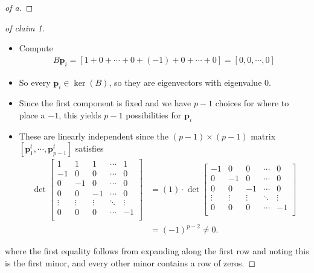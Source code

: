 \begin{solution}
\begin{proof}[of a]
\end{proof}

\begin{proof}[of claim 1]

\envlist

\begin{itemize}
\tightlist
\item
  Compute
  \begin{align*}B \mathbf{p}_i = {\left[ { 1 + 0 + \cdots + 0 + (-1) + 0 + \cdots + 0} \right]} = {\left[ {0, 0, \cdots, 0} \right]}\end{align*}
\item
  So every \(\mathbf{p}_i \in \ker(B)\), so they are eigenvectors with
  eigenvalue 0.
\item
  Since the first component is fixed and we have \(p-1\) choices for
  where to place a \(-1\), this yields \(p-1\) possibilities for
  \(\mathbf{p}_i\)
\item
  These are linearly independent since the \((p-1)\times (p-1)\) matrix
  \({\left[ { \mathbf{p}_1^t, \cdots, \mathbf{p}_{p-1}^t} \right]}\)
  satisfies
  \begin{align*}
  \det 
  \begin{bmatrix}
  1 & 1 & 1 & \cdots & 1\\
  -1 & 0  & 0 & \cdots & 0\\
  0 & -1  & 0 & \cdots & 0\\
  0 & 0 & -1 & \cdots & 0\\
  \vdots & \vdots  & \vdots & \ddots & \vdots \\
  0 & 0  & 0 & \cdots & -1\\
  \end{bmatrix}
  &= (1) \cdot \det 
  \begin{bmatrix}
  -1 & 0  & 0 & \cdots & 0\\
  0 & -1  & 0 & \cdots & 0\\
  0 & 0 & -1 & \cdots & 0\\
  \vdots & \vdots  & \vdots & \ddots & \vdots \\
  0 & 0  & 0 & \cdots & -1\\
  \end{bmatrix}
  \\
  &= (-1)^{p-2} \neq 0
  .\end{align*}
\end{itemize}

where the first equality follows from expanding along the first row and
noting this is the first minor, and every other minor contains a row of
zeros.


\end{proof}
\end{solution}
